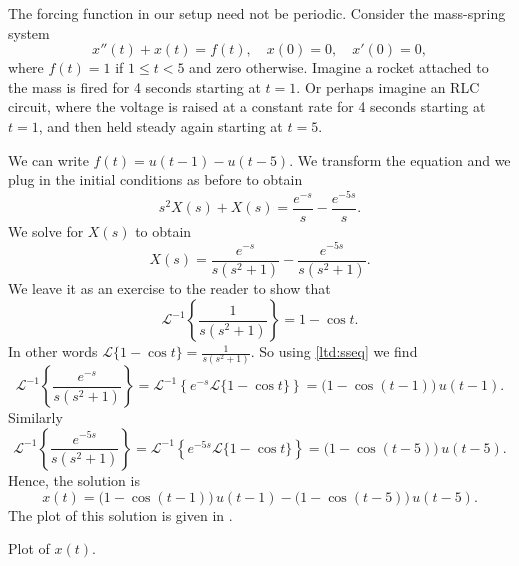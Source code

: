\begin{example} \label{lt:rocketex}
The forcing function in our setup need not be periodic.
Consider
the mass-spring system
\begin{equation*}
x''(t) + x(t) = f(t) , \quad x(0) = 0, \quad x'(0) = 0,
\end{equation*}
where $f(t) = 1$ if $1 \leq t < 5$ and zero otherwise.  Imagine a
rocket attached to the mass is fired for 4 seconds starting at
$t=1$.  Or perhaps imagine an RLC circuit, where the voltage is raised
at a constant rate for 4 seconds starting at $t=1$, and then held steady 
again
starting at $t=5$.

We can
write $f(t) = u(t-1) - u(t-5)$.  We transform the equation and we plug in
the initial conditions as before to obtain
\begin{equation*}
s^2 X(s) + X(s) = \frac{e^{-s}}{s} - \frac{e^{-5s}}{s} .
\end{equation*}
We solve for $X(s)$ to obtain
\begin{equation*}
X(s) = \frac{e^{-s}}{s(s^2+1)} - \frac{e^{-5s}}{s(s^2+1)} .
\end{equation*}
We leave it as an exercise to the reader to show that
\begin{equation*}
{\mathcal{L}}^{-1} \left\{ \frac{1}{s(s^2+1)} \right\}
= 1 - \cos t .
\end{equation*}
In other words 
$\mathcal{L} \{ 1 - \cos t  \} = 
\frac{1}{s(s^2+1)}$.  So using \eqref{ltd:sseq} we find
\begin{equation*}
{\mathcal{L}}^{-1} \left\{ \frac{e^{-s}}{s(s^2+1)} \right\}
=
{\mathcal{L}}^{-1} \left\{
e^{-s}
\mathcal{L} \{ 1 - \cos t \}
\right\}
=
\bigl( 1 - \cos (t-1) \bigr) \, u(t-1) .
\end{equation*}
Similarly
\begin{equation*}
{\mathcal{L}}^{-1} \left\{ \frac{e^{-5s}}{s(s^2+1)} \right\}
=
{\mathcal{L}}^{-1} \left\{
e^{-5s}
\mathcal{L} \{ 1 - \cos t \}
\right\}
=
\bigl( 1 - \cos (t-5) \bigr) \, u(t-5) .
\end{equation*}
Hence, the solution is
\begin{equation*}
x(t) = 
\bigl( 1 - \cos (t-1) \bigr) \, u(t-1) -
\bigl( 1 - \cos (t-5) \bigr) \, u(t-5) .
\end{equation*}
The plot of this solution is given in .

\begin{myfig}
\capstart
{}
\caption{Plot of $x(t)$.\label{lt:heavisideexfig}}
\end{myfig}
\end{example}

